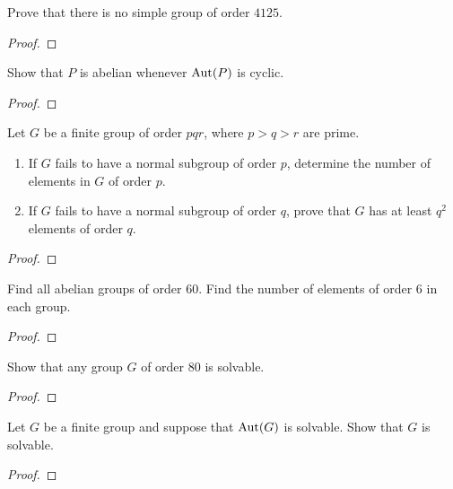 \begin{problem}
Prove that there is no simple group of order $4125$.
\end{problem}
\begin{proof}
\end{proof}

\begin{problem}
Show that $P$ is abelian whenever $\operatorname{Aut}(P)$ is cyclic.
\end{problem}
\begin{proof}
\end{proof}

\begin{problem}
Let $G$ be a finite group of order $pqr$, where $p>q>r$ are
prime.
\begin{enumerate}[label=(\alph*)]
\item If $G$ fails to have a normal subgroup of order $p$,
determine the number of elements in $G$ of order $p$.
\item If $G$ fails to have a normal subgroup of order $q$,
prove that $G$ has at least $q^2$ elements of order $q$.
\end{enumerate}
\end{problem}
\begin{proof}
\end{proof}

\begin{problem}
Find all abelian groups of order $60$. Find the number of
elements of order $6$ in each group. %
\end{problem}
\begin{proof}
\end{proof}

\begin{problem}
Show that any group $G$ of order $80$ is solvable.
\end{problem}
\begin{proof}
\end{proof}

\begin{problem}
Let $G$ be a finite group and suppose that $\operatorname{Aut}(G)$ is
solvable. Show that $G$ is solvable.
\end{problem}
\begin{proof}
\end{proof}

